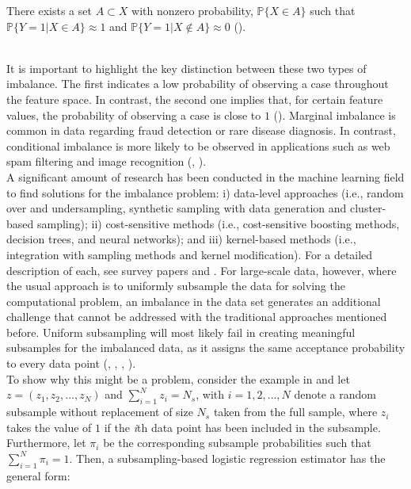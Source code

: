 \begin{definition}
There exists a set $A \subset X$ with nonzero probability, $\mathbb{P}\{X \in A\}$ such that $\mathbb{P}\{Y=1|X \in A\} \approx 1$ and $\mathbb{P}\{Y=1|X \notin A\} \approx 0$ (\cite{obrien2019}). 
\end{definition}\\


It is important to highlight the key distinction between these two types of imbalance. The first indicates a low probability of observing a case throughout the feature space. In contrast, the second one implies that, for certain feature values, the probability of observing a case is close to $1$ (\cite{obrien2019}). Marginal imbalance is common in data regarding fraud detection or rare disease diagnosis. In contrast, conditional imbalance is more likely to be observed in applications such as web spam filtering and image recognition (\cite{hastie2014},  \cite{han2020local}). \\

A significant amount of research has been conducted in the machine learning field to find solutions for the imbalance problem: i) data-level approaches (i.e., random over and undersampling, synthetic sampling with data generation and cluster-based sampling); ii) cost-sensitive methods (i.e., cost-sensitive boosting methods, decision trees, and neural networks); and iii) kernel-based methods (i.e., integration with sampling methods and kernel modification). For a detailed description of each, see survey papers \textcite{he2019} and \textcite{chawla2014editorial}. For large-scale data, however, where the usual approach is to uniformly subsample the data for solving the computational problem, an imbalance in the data set generates an additional challenge that cannot be addressed with the traditional approaches mentioned before. Uniform subsampling will most likely fail in creating meaningful subsamples for the imbalanced data, as it assigns the same acceptance probability to every data point (\cite{han2020local}, \cite{wang2020rare}, \cite{yao2021review}, \cite{hastie2014}). \\

To show why this might be a problem, consider the example in \textcite{cheng2020} and let $z=(z_1, z_2, ..., z_N)$ and $\sum_{i=1}^{N}z_i=N_s$, with $i=1,2, \dots, N$ denote a random subsample without replacement of size $N_s$ taken from the full sample, where $z_i$ takes the value of $1$ if the \textit{i}th data point has been included in the subsample. Furthermore, let $\pi_i$ be the corresponding subsample probabilities such that $\sum_{i=1}^{N} \pi_i = 1$. Then, a subsampling-based logistic regression estimator has the general form: 

